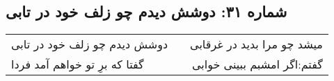 \begin{center}
\section*{شماره ۳۱: دوشش دیدم چو زلف خود در تابی}
\label{sec:031}
\begin{longtable}{l p{0.5cm} r}
دوشش دیدم چو زلف خود در تابی
&&
میشد چو مرا بدید در غرقابی
\\
گفتا که برِ تو خواهم آمد فردا
&&
گفتم:‌اگر امشبم ببینی خوابی
\\
\end{longtable}
\end{center}
